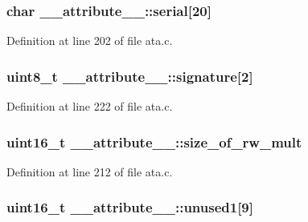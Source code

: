 \subsubsection[{\texorpdfstring{serial}{serial}}]{\setlength{\rightskip}{0pt plus 5cm}char \+\_\+\+\_\+attribute\+\_\+\+\_\+\+::serial\mbox{[}20\mbox{]}}\hypertarget{struct____attribute_____af239f8158f86e02086ba58fd19b81da7}{}\label{struct____attribute_____af239f8158f86e02086ba58fd19b81da7}


Definition at line 202 of file ata.\+c.

\subsubsection[{\texorpdfstring{signature}{signature}}]{\setlength{\rightskip}{0pt plus 5cm}uint8\+\_\+t \+\_\+\+\_\+attribute\+\_\+\+\_\+\+::signature\mbox{[}2\mbox{]}}\hypertarget{struct____attribute_____aaee33b58b76a81f69b6f3c5bb225c571}{}\label{struct____attribute_____aaee33b58b76a81f69b6f3c5bb225c571}


Definition at line 222 of file ata.\+c.

\subsubsection[{\texorpdfstring{size\+\_\+of\+\_\+rw\+\_\+mult}{size_of_rw_mult}}]{\setlength{\rightskip}{0pt plus 5cm}uint16\+\_\+t \+\_\+\+\_\+attribute\+\_\+\+\_\+\+::size\+\_\+of\+\_\+rw\+\_\+mult}\hypertarget{struct____attribute_____aff51436bd7bae12814f39dfdb34da0a9}{}\label{struct____attribute_____aff51436bd7bae12814f39dfdb34da0a9}


Definition at line 212 of file ata.\+c.

\subsubsection[{\texorpdfstring{unused1}{unused1}}]{\setlength{\rightskip}{0pt plus 5cm}uint16\+\_\+t \+\_\+\+\_\+attribute\+\_\+\+\_\+\+::unused1\mbox{[}9\mbox{]}}\hypertarget{struct____attribute_____a8d815909cef8ca1b062a2ad96c660a9c}{}\label{struct____attribute_____a8d815909cef8ca1b062a2ad96c660a9c}


